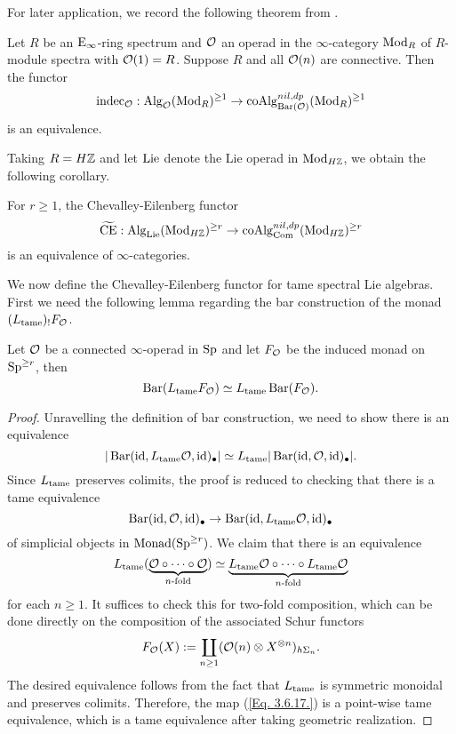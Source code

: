 For later application, we record the following theorem from \cite{Ching-Harper}.
\begin{theorem}
\cite{Ching-Harper}
\label{Ching-Harper's Koszul duality}
	Let $R$ be an $\operatorname{E}_{\infty}$-ring spectrum and ${\mathcal{O}}$ an operad in the $\infty$-category $\operatorname{Mod}_R$ of $R$-module spectra with ${\mathcal{O}}(1)=R$. Suppose $R$ and all ${\mathcal{O}}(n)$ are connective. Then the functor 
	\[
	\operatorname{indec}_{{\mathcal{O}}}: \operatorname{Alg}_{{\mathcal{O}}}(\operatorname{Mod}_R)^{\geq 1} \to \operatorname{coAlg}^{nil, dp}_{\operatorname{Bar}({\mathcal{O}})}(\operatorname{Mod}_R)^{\geq 1}
	\]
	 is an equivalence.
\end{theorem}

Taking $R=H{\mathbb{Z}}$ and let $\operatorname{Lie}$ denote the Lie operad in $\operatorname{Mod}_{H{\mathbb{Z}}}$, we obtain the following corollary.
\begin{corollary}
	For $r\geq 1$, the Chevalley-Eilenberg functor 
	\[
	\widetilde{\operatorname{CE}}: \operatorname{Alg}_{\operatorname{Lie}}(\operatorname{Mod}_{H{\mathbb{Z}}})^{\geq r} \to \operatorname{coAlg}^{nil, dp}_{\operatorname{Com}}(\operatorname{Mod}_{H{\mathbb{Z}}})^{\geq r}
	\]
	is an equivalence of $\infty$-categories.
\end{corollary}

We now define the Chevalley-Eilenberg functor for tame spectral Lie algebras. First we need the following lemma regarding the bar construction of the monad $(L_{\operatorname{\operatorname{tame}}})_{!}F_{{\mathcal{O}}}$.
\begin{lemma}
    Let ${\mathcal{O}}$ be a connected $\infty$-operad in $ \operatorname{Sp}$ and let $F_{{\mathcal{O}}}$ be the induced monad on $\operatorname{Sp}^{\geq r}$,
    then 
    $$
    \operatorname{Bar}(L_{\operatorname{\operatorname{tame}}}F_{\mathcal{O}} ) \simeq L_{\operatorname{\operatorname{tame}}} \operatorname{Bar}(F_{\mathcal{O}}).
    $$
\end{lemma}
\begin{proof}
    Unravelling the definition of bar construction, we need to show there is an equivalence
    $$
     |\operatorname{Bar}(\operatorname{id}, L_{\operatorname{\operatorname{tame}}}{\mathcal{O}} , \operatorname{id})_{\bullet}|
     \simeq
     L_{\operatorname{\operatorname{tame}}}|\operatorname{Bar}(\operatorname{id}, {\mathcal{O}} , \operatorname{id})_{\bullet}|.
    $$
    Since $L_{\operatorname{\operatorname{tame}}}$ preserves colimits, the proof is reduced to checking that
    there is a tame equivalence
    \begin{equation}
    \label{Eq. 3.6.17.}
    \operatorname{Bar}(\operatorname{id}, {\mathcal{O}} , \operatorname{id})_{\bullet}
    \to 
    \operatorname{Bar}(\operatorname{id}, L_{\operatorname{\operatorname{tame}}}{\mathcal{O}} , \operatorname{id})_{\bullet}
    \end{equation}
    of simplicial objects in $\operatorname{Monad}(\operatorname{Sp}^{\geq r})$. 
    We claim that there is an equivalence
    $$
    L_{\operatorname{\operatorname{tame}}} (\underbrace{{\mathcal{O}} \circ \cdots \circ {\mathcal{O}}}_{\text{$n$-fold}} )
    \simeq 
    \underbrace{ L_{\operatorname{\operatorname{tame}}}{\mathcal{O}} \circ \cdots \circ  L_{\operatorname{\operatorname{tame}}}{\mathcal{O}}}_{\text{$n$-fold}} 
    $$
    for each $n\geq 1$.
    It suffices to check this for two-fold composition, which can be done directly on the composition of the associated Schur functors
    $$
    F_{{\mathcal{O}}}(X):= \coprod_{n\geq 1} ({\mathcal{O}}(n) \otimes X^{\otimes n})_{h\Sigma_n}.
    $$ 
    The desired equivalence follows from the fact that $L_{\operatorname{\operatorname{tame}}}$ is symmetric monoidal and preserves colimits.
    Therefore, the map (\ref{Eq. 3.6.17.}) is a point-wise tame equivalence, which is a tame equivalence after taking geometric realization.
\end{proof}

